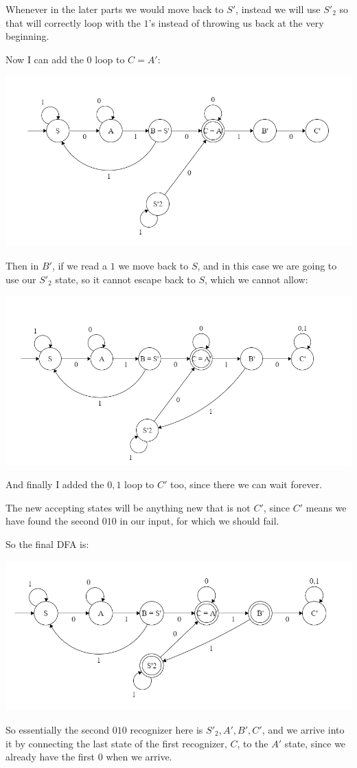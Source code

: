 Whenever in the later parts we would move back to $S'$, instead we will use $S'_2$ so that will correctly loop with the $1$'s instead of throwing us back at the very beginning.

Now I can add the $0$ loop to $C = A'$:

\begin{center}
    \includegraphics[width=\linewidth]{./exams/misc/02/step_4.png}
\end{center}

Then in $B'$, if we read a $1$ we move back to $S$, and in this case we are going to use our $S'_2$ state, so it cannot escape back to $S$, which we cannot allow:

\begin{center}
    \includegraphics[width=\linewidth]{./exams/misc/02/step_5.png}
\end{center}

And finally I added the $0,1$ loop to $C'$ too, since there we can wait forever.

The new accepting states will be anything new that is not $C'$, since $C'$ means we have found the second $010$ in our input, for which we should fail.

So the final DFA is:

\begin{center}
    \includegraphics[width=\linewidth]{./exams/misc/02/step_6.png}
\end{center}

So essentially the second $010$ recognizer here is $S'_2, A', B', C'$, and we arrive into it by connecting the last state of the first recognizer, $C$, to the $A'$ state, since we already have the first $0$ when we arrive.